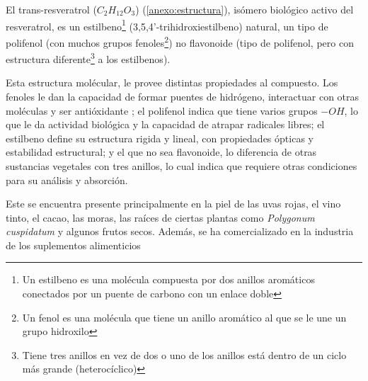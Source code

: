 El trans-resveratrol ($C_2H_12O_3$) (\ref{anexo:estructura}), isómero biológico activo del resveratrol,
 es un estilbeno\footnote{Un estilbeno es una molécula compuesta por dos anillos aromáticos conectados por un puente de carbono con un enlace doble} 
 (3,5,4'-trihidroxiestilbeno) natural,
un tipo de polifenol (con muchos grupos fenoles\footnote{Un fenol es una molécula que tiene un anillo aromático al que se le une un grupo hidroxilo})
no flavonoide (tipo de polifenol, pero con estructura diferente\footnote{Tiene tres anillos en vez de dos o uno de los anillos está dentro de un ciclo más grande (heterocíclico)} a los estilbenos).


Esta estructura molécular, le provee distintas propiedades al compuesto. Los fenoles le dan la capacidad
de formar puentes de hidrógeno, interactuar con otras moléculas y ser antióxidante \parencite{polifenolantioxidante};
el polifenol indica que tiene varios grupos $-OH$, lo que le da actividad biológica y la capacidad de
atrapar radicales libres; el estilbeno define su estructura rigida y lineal, con propiedades ópticas
y estabilidad estructural; y el que no sea flavonoide, lo diferencia de otras sustancias vegetales
con tres anillos, lo cual indica que requiere otras condiciones para su análisis y absorción.

Este se encuentra presente principalmente en la piel de las uvas rojas,
el vino tinto, el cacao, las moras, las raíces de ciertas plantas como \textit{Polygonum cuspidatum}
 y algunos frutos secos. Además, se ha comercializado en la industria de los suplementos
 alimenticios